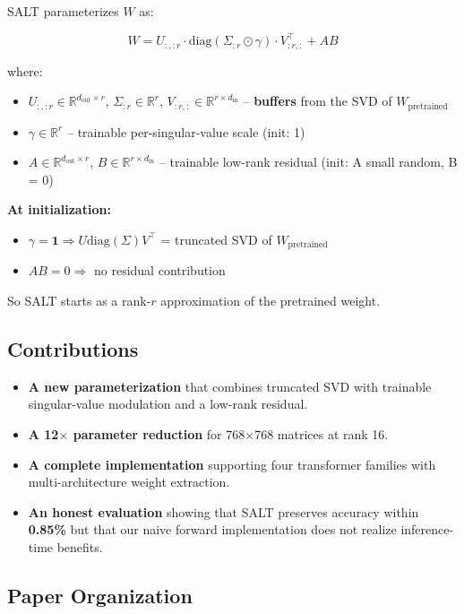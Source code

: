 SALT parameterizes $W$ as:

\[
W = U_{:,:r} \cdot \text{diag}(\Sigma_{:r} \odot \gamma) \cdot V_{:r,:}^\top + A B
\tag{1.2}
\]

where:

\begin{itemize}
\item $U_{:,:r} \in \mathbb{R}^{d_\text{out} \times r}$,
  $\Sigma_{:r} \in \mathbb{R}^r$,
  $V_{:r,:} \in \mathbb{R}^{r \times d_\text{in}}$ -- \textbf{buffers} from the SVD of $W_\text{pretrained}$
\item $\gamma \in \mathbb{R}^r$ -- trainable per-singular-value scale (init: 1)
\item $A \in \mathbb{R}^{d_\text{out} \times r}$,
  $B \in \mathbb{R}^{r \times d_\text{in}}$ -- trainable low-rank residual (init: A small random, B = 0)

\end{itemize}
\textbf{At initialization:}
\begin{itemize}
\item $\gamma = \mathbf{1} \Rightarrow U \text{diag}(\Sigma) V^\top$ = truncated SVD of $W_\text{pretrained}$
\item $A B = 0 \Rightarrow$ no residual contribution

\end{itemize}
So SALT starts as a rank-$r$ approximation of the pretrained weight.

\subsection{Contributions}

\begin{itemize}
\item \textbf{A new parameterization} that combines truncated SVD with trainable
  singular-value modulation and a low-rank residual.
\item \textbf{A 12$\times$ parameter reduction} for 768$\times$768 matrices at rank 16.
\item \textbf{A complete implementation} supporting four transformer families with
  multi-architecture weight extraction.
\item \textbf{An honest evaluation} showing that SALT preserves accuracy within
  \textbf{0.85\%} but that our naive forward implementation does not
  realize inference-time benefits.

\end{itemize}
\subsection{Paper Organization}

